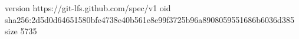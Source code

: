 version https://git-lfs.github.com/spec/v1
oid sha256:2d5d0d64651580bfe4738e40b561e8e99f3725b96a8908059551686b6036d385
size 5735
